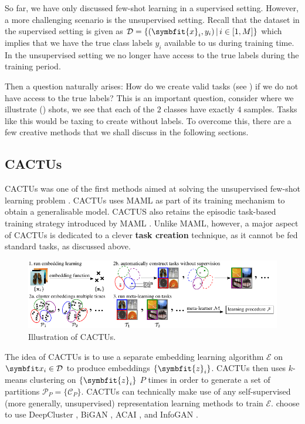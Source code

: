So far, we have only discussed few-shot learning in a supervised setting. However, a more challenging scenario is the unsupervised setting. Recall that the dataset in the supervised setting is given as \(\mathcal{D} = \left\{(\symbfit{x}_i, y_i)\, |\, i \in [1,M]\right\}\) which implies that we have the true class labels $y_i$ available to us during training time. In the unsupervised setting we no longer have access to the true labels during the training period. 

Then a question naturally arises: How do we create valid tasks (see ) if we do not have access to the true labels? This is an important question, consider  where we illustrate () shots, we see that each of the $2$ classes have exactly $4$ samples. Tasks like this would be taxing to create without labels. To overcome this, there are a few creative methods that we shall discuss in the following sections.

\subsection{CACTUs}\label{ssec:ufsl-cactus}
CACTUs was one of the first methods aimed at solving the unsupervised few-shot learning problem \parencite{Hsu2018UnsupervisedMeta-Learning}. CACTUs uses MAML as part of its training mechanism to obtain a generalisable model. CACTUS also retains the episodic task-based training strategy introduced by MAML \parencite{Finn2017Model-agnosticNetworks}. Unlike MAML, however, a major aspect of CACTUs is dedicated to a clever \textbf{task creation} technique, as it cannot be fed standard tasks, as discussed above.
\begin{figure}[ht]
    \centering
    \includegraphics[width=\linewidth]{chapters/assets/fsl/cactus.pdf}
    \caption{Illustration of CACTUs. }
    \label{fig:cactus}
\end{figure}
The idea of CACTUs is to use a separate embedding learning algorithm $\mathcal{E}$ on $\bfitx_i \in \mathcal{D}$ to produce embeddings $\{\symbfit{z}_i\}$. CACTUs then uses $k$-means clustering on $\{\symbfit{z}_i\}$ $P$ times in order to generate a set of partitions $\mathcal{P}_P = \{\mathcal{C}_P\}$. CACTUs can technically make use of any self-supervised (more generally, unsupervised) representation learning methods to train $\mathcal{E}$. \textcite{Hsu2018UnsupervisedMeta-Learning} choose to use DeepCluster \parencite{caron2018deep}, BiGAN \parencite{berthelot2018understanding}, ACAI \parencite{donahue2016adversarial}, and InfoGAN \parencite{chen2016infogan}. 


